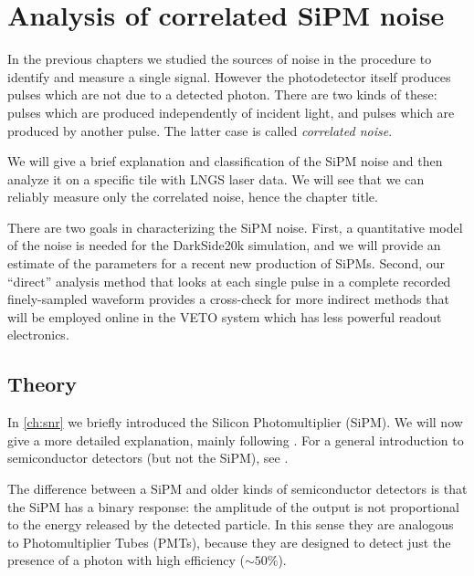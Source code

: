 \chapter{Analysis of correlated SiPM noise}
\label{ch:anal}

In the previous chapters we studied the sources of noise in the procedure to
identify and measure a single signal. However the photodetector itself produces
pulses which are not due to a detected photon. There are two kinds of these:
pulses which are produced independently of incident light, and pulses which are
produced by another pulse. The latter case is called \emph{correlated noise}.

We will give a brief explanation and classification of the SiPM noise and then
analyze it on a specific tile with LNGS laser data. We will see that we can
reliably measure only the correlated noise, hence the chapter title.

There are two goals in characterizing the SiPM noise. First, a quantitative
model of the noise is needed for the DarkSide20k simulation, and we will
provide an estimate of the parameters for a recent new production of SiPMs.
Second, our ``direct'' analysis method that looks at each single pulse in a
complete recorded finely-sampled waveform provides a cross-check for more
indirect methods that will be employed online in the VETO system which has less
powerful readout electronics.


\section{Theory}
\label{sec:analtheory}


In \autoref{ch:snr} we briefly introduced the Silicon Photomultiplier (SiPM).
We will now give a more detailed explanation, mainly following
\cite[ch.~3]{savarese2018}. For a general introduction to semiconductor
detectors (but not the SiPM), see \cite[ch.~11]{knoll2010}.

The difference between a SiPM and older kinds of semiconductor detectors is
that the SiPM has a binary response: the amplitude of the output is not
proportional to the energy released by the detected particle. In this sense
they are analogous to Photomultiplier Tubes (PMTs), because they are designed
to detect just the presence of a photon with high efficiency ($\sim\SI{50}\%$).

